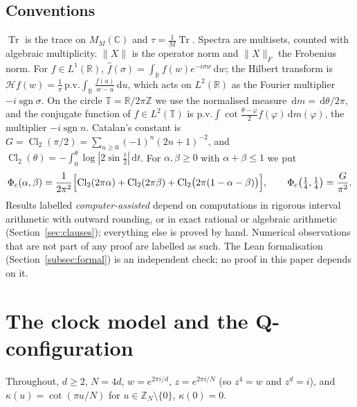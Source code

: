 \documentclass[11pt]{amsart}
\theoremstyle{definition}
\theoremstyle{remark}
\numberwithin{equation}{section}
\newcommand{\Z}{\mathbb{Z}}
\newcommand{\R}{\mathbb{R}}
\newcommand{\C}{\mathbb{C}}
\newcommand{\T}{\mathbb{T}}
\newcommand{\Tr}{\operatorname{Tr}}
\newcommand{\Cl}{\operatorname{Cl}_2}
\newcommand{\cH}{\mathcal{H}}
\newcommand{\Phic}{\Phi_{\mathrm c}}
\newcommand{\pv}{\mathrm{p.v.}}
\newcommand{\dd}{\,\mathrm{d}}
\begin{document}
\subsection{Conventions}\label{subsec:conventions}
$\Tr$ is the trace on $M_M(\C)$ and $\tau=\frac1M\Tr$. Spectra are multisets, counted with algebraic multiplicity.
$\|X\|$ is the operator norm and $\|X\|_F$ the Frobenius norm. For $f\in L^1(\R)$,
$\hat f(\sigma)=\int_\R f(w)e^{-i\sigma w}\dd w$; the Hilbert transform is
$\cH f(w)=\frac1\pi\,\pv\!\int_\R\frac{f(u)}{w-u}\dd u$, which acts on $L^2(\R)$ as the Fourier multiplier
$-i\operatorname{sgn}\sigma$. On the circle $\T=\R/2\pi\Z$ we use the normalised measure $\dd m=\dd\theta/2\pi$, and
the conjugate function of $f\in L^2(\T)$ is $\pv\!\int\cot\frac{\theta-\varphi}2f(\varphi)\dd m(\varphi)$, the
multiplier $-i\operatorname{sgn}n$. Catalan's constant is $G=\Cl(\pi/2)=\sum_{n\ge0}(-1)^n(2n+1)^{-2}$, and
$\Cl(\theta)=-\int_0^\theta\log|2\sin\frac t2|\dd t$. For $\alpha,\beta\ge0$ with $\alpha+\beta\le1$ we put
\begin{equation}\label{eq:Phic}
\Phic(\alpha,\beta)=\frac1{2\pi^2}\Bigl[\Cl(2\pi\alpha)+\Cl(2\pi\beta)+\Cl\bigl(2\pi(1-\alpha-\beta)\bigr)\Bigr],
\qquad \Phic\bigl(\tfrac14,\tfrac14\bigr)=\frac{G}{\pi^2}.
\end{equation}
Results labelled \emph{computer-assisted} depend on computations in rigorous interval arithmetic with outward
rounding, or in exact rational or algebraic arithmetic (Section~\ref{sec:clauses}); everything else is proved by hand. Numerical observations that are not part of any proof are labelled as
such. The Lean formalisation (Section~\ref{subsec:formal}) is an independent check; no proof in this paper depends on
it.

\section{The clock model and the Q-configuration}\label{sec:reduction}

Throughout, $d\ge2$, $N=4d$, $w=e^{2\pi i/d}$, $z=e^{2\pi i/N}$ (so $z^4=w$ and $z^d=i$), and
$\kappa(u)=\cot(\pi u/N)$ for $u\in\Z_N\setminus\{0\}$, $\kappa(0)=0$.
\end{document}
